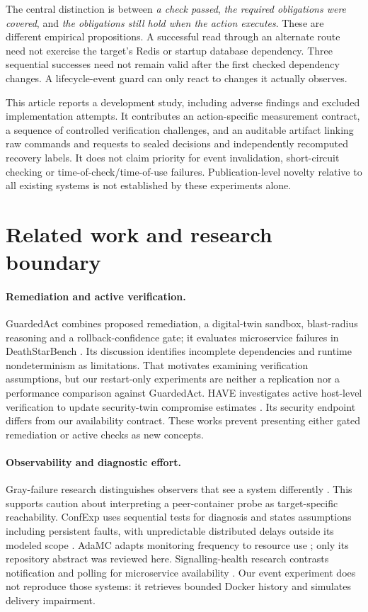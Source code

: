 \documentclass[11pt]{article}
\begin{document}
The central distinction is between \emph{a check passed}, \emph{the required obligations were covered}, and \emph{the obligations still hold when the action executes}. These are different empirical propositions. A successful read through an alternate route need not exercise the target's Redis or startup database dependency. Three sequential successes need not remain valid after the first checked dependency changes. A lifecycle-event guard can only react to changes it actually observes.

This article reports a development study, including adverse findings and excluded implementation attempts. It contributes an action-specific measurement contract, a sequence of controlled verification challenges, and an auditable artifact linking raw commands and requests to sealed decisions and independently recomputed recovery labels. It does not claim priority for event invalidation, short-circuit checking or time-of-check/time-of-use failures. Publication-level novelty relative to all existing systems is not established by these experiments alone.

\section{Related work and research boundary}
\paragraph{Remediation and active verification.}
GuardedAct combines proposed remediation, a digital-twin sandbox, blast-radius reasoning and a rollback-confidence gate; it evaluates microservice failures in DeathStarBench \cite{guarded}. Its discussion identifies incomplete dependencies and runtime nondeterminism as limitations. That motivates examining verification assumptions, but our restart-only experiments are neither a replication nor a performance comparison against GuardedAct. HAVE investigates active host-level verification to update security-twin compromise estimates \cite{have}. Its security endpoint differs from our availability contract. These works prevent presenting either gated remediation or active checks as new concepts.

\paragraph{Observability and diagnostic effort.}
Gray-failure research distinguishes observers that see a system differently \cite{gray}. This supports caution about interpreting a peer-container probe as target-specific reachability. ConfExp uses sequential tests for diagnosis and states assumptions including persistent faults, with unpredictable distributed delays outside its modeled scope \cite{confexp}. AdaMC adapts monitoring frequency to resource use \cite{adamc}; only its repository abstract was reviewed here. Signalling-health research contrasts notification and polling for microservice availability \cite{signalling}. Our event experiment does not reproduce those systems: it retrieves bounded Docker history and simulates delivery impairment.
\end{document}
